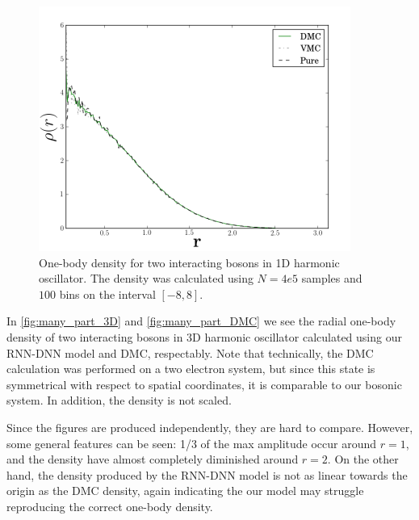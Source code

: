 \begin{figure}[H]
	\includegraphics[scale=0.6]{figures/onebody3d.png}
	\caption{One-body density for two interacting bosons in 1D harmonic oscillator. The density was calculated using $N=4e5$ samples and $100$ bins on the interval $[-8,8]$.}
	\label{fig:many_part_DMC}
\end{figure}

In \autoref{fig:many_part_3D} and \autoref{fig:many_part_DMC} we see the radial one-body density of two interacting bosons in 3D harmonic oscillator calculated using our RNN-DNN model and DMC, respectably. Note that technically, the DMC calculation was performed on a two electron system, but since this state is symmetrical with respect to spatial coordinates, it is comparable to our bosonic system. In addition, the density is not scaled.

Since the figures are produced independently, they are hard to compare. However, some general features can be seen: 1/3 of the max amplitude occur around $r=1$, and the density have almost completely diminished around $r=2$. On the other hand, the density produced by the RNN-DNN model is not as linear towards the origin as the DMC density, again indicating the our model may struggle reproducing the correct one-body density.


